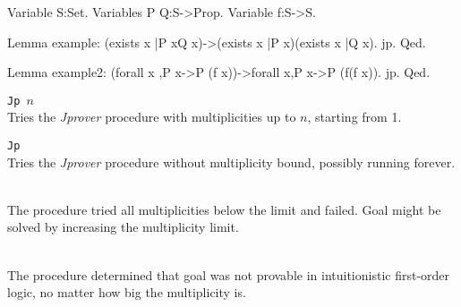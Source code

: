 \begin{coq_eval}
Variable S:Set.
Variables P Q:S->Prop.
Variable f:S->S.
\end{coq_eval}

\begin{coq_example*}
Lemma example: (exists x |P x\/Q x)->(exists x |P x)\/(exists x |Q x).
jp.
Qed.

Lemma example2: (forall x ,P x->P (f x))->forall x,P x->P (f(f x)).
jp.
Qed.
\end{coq_example*}

\begin{Variants}
 \item {\tt Jp $n$}\\
   Tries the {\em Jprover} procedure with multiplicities up to $n$,
   starting from 1.
 \item {\tt Jp}\\
   Tries the {\em Jprover} procedure without multiplicity bound, 
   possibly running forever.
\end{Variants}

\begin{ErrMsgs}
 \item {}\\
   The procedure tried all multiplicities below the limit and
   failed. Goal might be solved by increasing the multiplicity limit. 
 \item {}\\
   The procedure determined that goal was not provable in
   intuitionistic first-order logic, no matter how big the
   multiplicity is.
\end{ErrMsgs}




